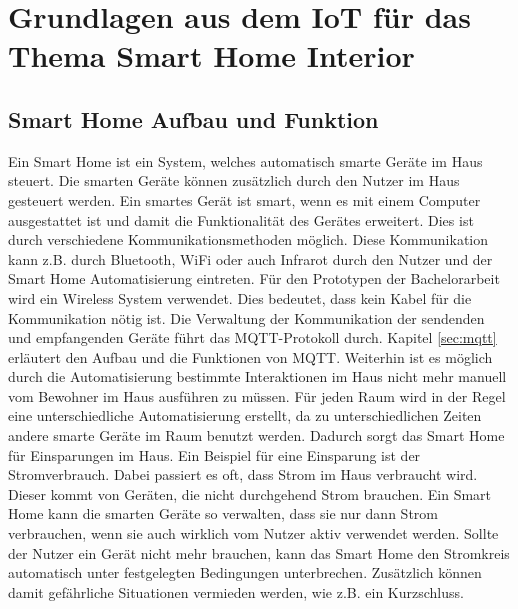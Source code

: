 \chapter{Grundlagen aus dem IoT für das Thema Smart Home Interior}
\label{cha:grdl}

\section{Smart Home Aufbau und Funktion}
Ein Smart Home ist ein System, welches automatisch smarte Geräte im Haus steuert. Die smarten Geräte können zusätzlich durch den Nutzer im Haus gesteuert werden. Ein smartes Gerät ist smart, wenn es mit einem Computer ausgestattet ist und damit die Funktionalität des Gerätes erweitert. Dies ist durch verschiedene Kommunikationsmethoden möglich. Diese Kommunikation kann z.B. durch Bluetooth, WiFi oder auch Infrarot durch den Nutzer und der Smart Home Automatisierung eintreten. Für den Prototypen der Bachelorarbeit wird ein Wireless System verwendet. Dies bedeutet, dass kein Kabel für die Kommunikation nötig ist. Die Verwaltung der Kommunikation der sendenden und empfangenden Geräte führt das MQTT-Protokoll durch. Kapitel \ref{sec:mqtt} erläutert den Aufbau und die Funktionen von MQTT. 
\newline
Weiterhin ist es möglich durch die Automatisierung bestimmte Interaktionen im Haus nicht mehr manuell vom Bewohner im Haus ausführen zu müssen. Für jeden Raum wird in der Regel eine unterschiedliche Automatisierung erstellt, da zu unterschiedlichen Zeiten andere smarte Geräte im Raum benutzt werden. Dadurch sorgt das Smart Home für Einsparungen im Haus.
\newline
Ein Beispiel für eine Einsparung ist der Stromverbrauch. Dabei passiert es oft, dass Strom im Haus verbraucht wird. Dieser kommt von Geräten, die nicht durchgehend Strom brauchen. Ein Smart Home kann die smarten Geräte so verwalten, dass sie nur dann Strom verbrauchen, wenn sie auch wirklich vom Nutzer aktiv verwendet werden. Sollte der Nutzer ein Gerät nicht mehr brauchen, kann das Smart Home den Stromkreis automatisch unter festgelegten Bedingungen unterbrechen. Zusätzlich können damit gefährliche Situationen vermieden werden, wie z.B. ein Kurzschluss. \citep{sripan2012research}
\newline
